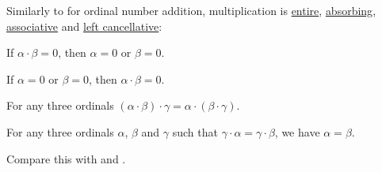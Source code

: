 \begin{proposition}\label{thm:ordinal_multiplication_algebraic_properties}
  Similarly to  for ordinal number addition, multiplication is \hyperref[def:entire_semiring]{entire}, \hyperref[def:semiring/absorption]{absorbing}, \hyperref[def:binary_operation/associative]{associative} and \hyperref[def:binary_operation/cancellative]{left cancellative}:
  \begin{thmenum}
     If \( \alpha \cdot \beta = 0 \), then \( \alpha = 0 \) or \( \beta = 0 \).

     If \( \alpha = 0 \) or \( \beta = 0 \), then \( \alpha \cdot \beta = 0 \).

     For any three ordinals \( (\alpha \cdot \beta) \cdot \gamma = \alpha \cdot (\beta \cdot \gamma) \).

     For any three ordinals \( \alpha \), \( \beta \) and \( \gamma \) such that \( \gamma \cdot \alpha = \gamma \cdot \beta \), we have \( \alpha = \beta \).
  \end{thmenum}

  Compare this with  and .
\end{proposition}
